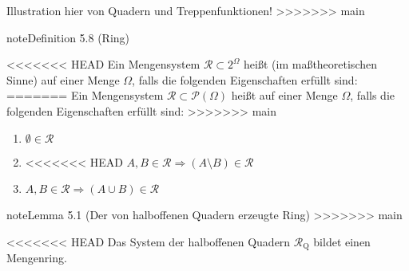 \documentclass[letterpaper,10pt,english]{jupyterBook}
\begin{document}
\sphinxAtStartPar
Illustration hier von Quadern und Treppenfunktionen!
\label{masstheorie/masstheorie:definition-8}
>>>>>>> main
\begin{sphinxadmonition}{note}{Definition 5.8 (Ring)}



\sphinxAtStartPar
<<<<<<< HEAD
Ein Mengensystem \(\mathcal{R} \subset 2^{\Omega}\) heißt  (im maßtheoretischen Sinne) auf einer Menge \(\Omega\), falls die folgenden Eigenschaften erfüllt sind:
=======
Ein Mengensystem \(\mathcal{R} \subset \mathcal{P}(\Omega)\) heißt  auf einer Menge \(\Omega\), falls die folgenden Eigenschaften erfüllt sind:
>>>>>>> main
\begin{enumerate}
%
\item {} 
\sphinxAtStartPar
\(\emptyset \in \mathcal{R}\)

\item {} 
\sphinxAtStartPar
<<<<<<< HEAD
\(A,B \in \mathcal{R} \Rightarrow (A \setminus B) \in \mathcal{R}\)

\item {} 
\sphinxAtStartPar
\(A,B \in \mathcal{R} \Rightarrow (A \cup B) \in \mathcal{R}\)

\end{enumerate}
\end{sphinxadmonition}
\label{masstheorie/masstheorie:lemma-14}
\label{masstheorie/masstheorie:lemma-9}
\begin{sphinxadmonition}{note}{Lemma 5.1 (Der von halboffenen Quadern erzeugte Ring)}
>>>>>>> main



\sphinxAtStartPar
<<<<<<< HEAD
Das System der halboffenen Quadern \(\mathcal{R}_{\text{Q}}\) bildet einen Mengenring.
\end{sphinxadmonition}
\end{document}
